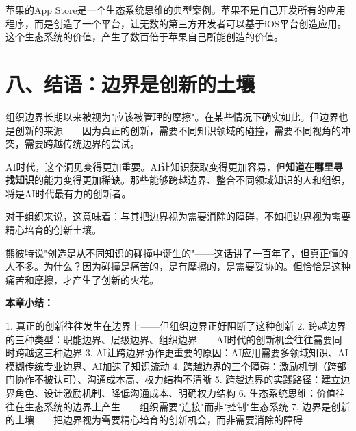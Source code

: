 苹果的App Store是一个生态系统思维的典型案例。苹果不是自己开发所有的应用程序，而是创造了一个平台，让无数的第三方开发者可以基于iOS平台创造应用。这个生态系统的价值，产生了数百倍于苹果自己所能创造的价值。

\section{八、结语：边界是创新的土壤}


组织边界长期以来被视为"应该被管理的摩擦"。在某些情况下确实如此。但边界也是创新的来源——因为真正的创新，需要不同知识领域的碰撞，需要不同视角的冲突，需要跨越传统边界的尝试。

AI时代，这个洞见变得更加重要。AI让知识获取变得更加容易，但\textbf{知道在哪里寻找知识}的能力变得更加稀缺。那些能够跨越边界、整合不同领域知识的人和组织，将是AI时代最有力的创新者。

对于组织来说，这意味着：与其把边界视为需要消除的障碍，不如把边界视为需要精心培育的创新土壤。

熊彼特说"创造是从不同知识的碰撞中诞生的"——这话讲了一百年了，但真正懂的人不多。为什么？因为碰撞是痛苦的，是有摩擦的，是需要妥协的。但恰恰是这种痛苦和摩擦，才产生了创新的火花。


\textbf{本章小结：}

1. 真正的创新往往发生在边界上——但组织边界正好阻断了这种创新
2. 跨越边界的三种类型：职能边界、层级边界、组织边界——AI时代的创新机会往往需要同时跨越这三种边界
3. AI让跨边界协作更重要的原因：AI应用需要多领域知识、AI模糊传统专业边界、AI加速了知识流动
4. 跨越边界的三个障碍：激励机制（跨部门协作不被认可）、沟通成本高、权力结构不清晰
5. 跨越边界的实践路径：建立边界角色、设计激励机制、降低沟通成本、明确权力结构
6. 生态系统思维：价值往往在生态系统的边界上产生——组织需要"连接"而非"控制"生态系统
7. 边界是创新的土壤——把边界视为需要精心培育的创新机会，而非需要消除的障碍
